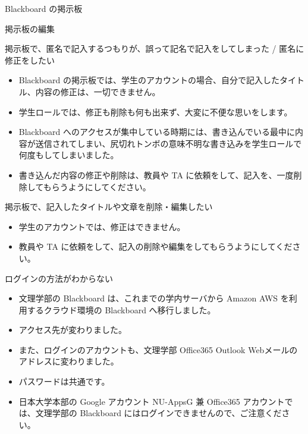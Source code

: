 \documentclass[a4j,10pt]{jsarticle}
\def\lthtmlcheckvsize{\ifdim\ht\sizebox<\vsize 
  \ifdim\wd\sizebox<\hsize\expandafter\hfill\fi \expandafter\vfill
  \else\expandafter\vss\fi}%
\begin{document}
{\newpage\clearpage
{}%
\begin{frame}[label={sec:orgd94bd2c},fragile]{Blackboard の掲示板}
\begin{block}{掲示板の編集}
\begin{block}{掲示板で、匿名で記入するつもりが、誤って記名で記入をしてしまった / 匿名に修正をしたい}
\begin{itemize}
\item Blackboard の掲示板では、学生のアカウントの場合、自分で記入したタイトル、内容の修正は、一切できません。
\item 学生ロールでは、修正も削除も何も出来ず、大変に不便な思いをします。
\item Blackboard へのアクセスが集中している時期には、書き込んでいる最中に内容が送信されてしまい、尻切れトンボの意味不明な書き込みを学生ロールで何度もしてしまいました。
\item 書き込んだ内容の修正や削除は、教員や TA に依頼をして、記入を、一度削除してもらうようにしてください。
\end{itemize}
\end{block}
\par
\begin{block}{掲示板で、記入したタイトルや文章を削除・編集したい}
\begin{itemize}
\item 学生のアカウントでは、修正はできません。
\item 教員や TA に依頼をして、記入の削除や編集をしてもらうようにしてください。
\end{itemize}
\end{block}
\par
\begin{block}{ログインの方法がわからない}
\begin{itemize}
\item 文理学部の Blackboard は、これまでの学内サーバから Amazon AWS を利用するクラウド環境の Blackboard へ移行しました。
\item アクセス先が変わりました。
\item また、ログインのアカウントも、文理学部 Office365 Outlook Webメールのアドレスに変わりました。
\item パスワードは共通です。
\item 日本大学本部の Google アカウント NU-AppsG 兼 Office365 アカウントでは、文理学部の Blackboard にはログインできませんので、ご注意ください。
\end{itemize}
\end{block}
\end{block}
\end{frame}%
\lthtmlfigureZ
\lthtmlcheckvsize\clearpage}
\end{document}

